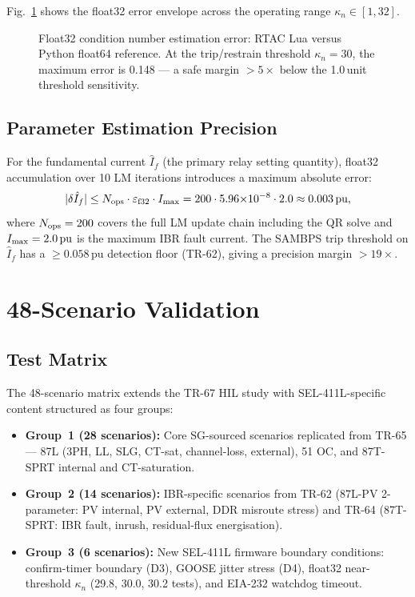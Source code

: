 \documentclass[journal,twoside]{IEEEtran}
\begin{document}
Fig.~\ref{fig:float32} shows the float32 error envelope across the
operating range $\kappa_n \in [1, 32]$.

\begin{figure}[t]
  \centering
  
  \caption{Float32 condition number estimation error: RTAC Lua versus Python
    float64 reference.
    At the trip/restrain threshold $\kappa_n = 30$, the maximum error is
    0.148 --- a safe margin $> 5\times$ below the 1.0\,unit threshold
    sensitivity.}
  \label{fig:float32}
\end{figure}

\subsection{Parameter Estimation Precision}

For the fundamental current $\hat{I}_f$ (the primary relay setting quantity),
float32 accumulation over 10 LM iterations introduces a maximum absolute
error:
\begin{equation}
  |\delta\hat{I}_f| \leq N_{\rm ops} \cdot \varepsilon_{\rm f32}
    \cdot I_{\rm max} = 200 \cdot 5.96{\times}10^{-8} \cdot 2.0
    \approx 0.003\,\text{pu},
  \label{eq:If_bound}
\end{equation}
where $N_{\rm ops} = 200$ covers the full LM update chain including the QR
solve and $I_{\rm max} = 2.0\,\text{pu}$ is the maximum IBR fault current.
The SAMBPS trip threshold on $\hat{I}_f$ has a $\geq 0.058\,\text{pu}$
detection floor (TR-62), giving a precision margin $> 19\times$.

\section{48-Scenario Validation}
\label{sec:validation}

\subsection{Test Matrix}

The 48-scenario matrix extends the TR-67 HIL study with SEL-411L-specific
content structured as four groups:
\begin{itemize}
  \item \textbf{Group~1 (28 scenarios):} Core SG-sourced scenarios replicated
        from TR-65 --- 87L (3PH, LL, SLG, CT-sat, channel-loss, external),
        51 OC, and 87T-SPRT internal and CT-saturation.
  \item \textbf{Group~2 (14 scenarios):} IBR-specific scenarios from TR-62
        (87L-PV 2-parameter: PV internal, PV external, DDR misroute stress)
        and TR-64 (87T-SPRT: IBR fault, inrush, residual-flux energisation).
  \item \textbf{Group~3 (6 scenarios):} New SEL-411L firmware boundary
        conditions: confirm-timer boundary (D3), GOOSE jitter stress (D4),
        float32 near-threshold $\kappa_n$ (29.8, 30.0, 30.2 tests), and
        EIA-232 watchdog timeout.
\end{itemize}
\end{document}
